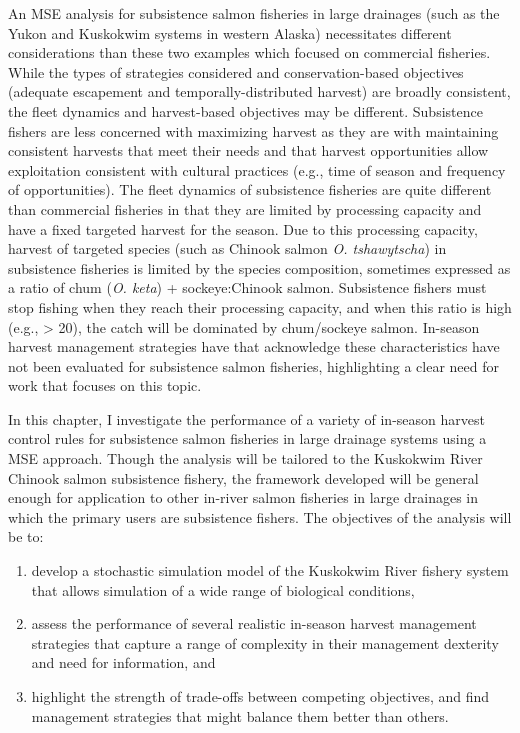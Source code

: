 \documentclass[12pt,]{book}
\theoremstyle{definition}
\theoremstyle{definition}
\theoremstyle{definition}
\theoremstyle{remark}
\begin{document}
An MSE analysis for subsistence salmon fisheries in large drainages
(such as the Yukon and Kuskokwim systems in western Alaska) necessitates
different considerations than these two examples which focused on
commercial fisheries. While the types of strategies considered and
conservation-based objectives (adequate escapement and
temporally-distributed harvest) are broadly consistent, the fleet
dynamics and harvest-based objectives may be different. Subsistence
fishers are less concerned with maximizing harvest as they are with
maintaining consistent harvests that meet their needs and that harvest
opportunities allow exploitation consistent with cultural practices
(e.g., time of season and frequency of opportunities). The fleet
dynamics of subsistence fisheries are quite different than commercial
fisheries in that they are limited by processing capacity and have a
fixed targeted harvest for the season. Due to this processing capacity,
harvest of targeted species (such as Chinook salmon \emph{O.
tshawytscha}) in subsistence fisheries is limited by the species
composition, sometimes expressed as a ratio of chum (\emph{O. keta}) +
sockeye:Chinook salmon. Subsistence fishers must stop fishing when they
reach their processing capacity, and when this ratio is high (e.g.,
\textgreater{} 20), the catch will be dominated by chum/sockeye salmon.
In-season harvest management strategies have that acknowledge these
characteristics have not been evaluated for subsistence salmon
fisheries, highlighting a clear need for work that focuses on this
topic.

In this chapter, I investigate the performance of a variety of in-season
harvest control rules for subsistence salmon fisheries in large drainage
systems using a MSE approach. Though the analysis will be tailored to
the Kuskokwim River Chinook salmon subsistence fishery, the framework
developed will be general enough for application to other in-river
salmon fisheries in large drainages in which the primary users are
subsistence fishers. The objectives of the analysis will be to:

\begin{enumerate}
\def\labelenumi{(\arabic{enumi})}
\item
  develop a stochastic simulation model of the Kuskokwim River fishery
  system that allows simulation of a wide range of biological
  conditions,
\item
  assess the performance of several realistic in-season harvest
  management strategies that capture a range of complexity in their
  management dexterity and need for information, and
\item
  highlight the strength of trade-offs between competing objectives, and
  find management strategies that might balance them better than others.
\end{enumerate}
\end{document}
